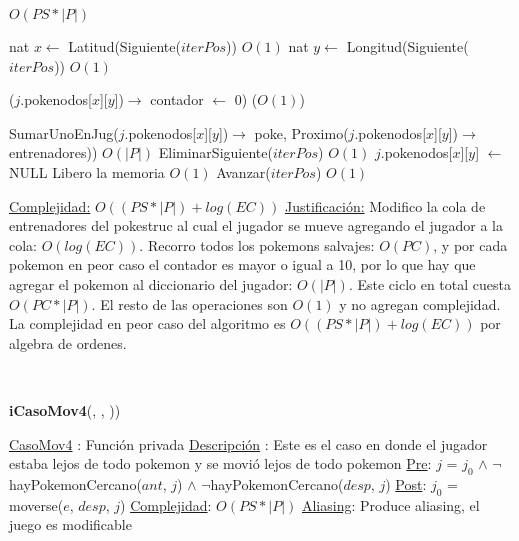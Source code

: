 \begin{Algoritmos}
\begin{algorithmic}[1]
 \Comment $O(PS * |P|)$

  \State nat $x \gets$ Latitud(Siguiente($iterPos$)) \Comment $O(1)$
  \State nat $y \gets$ Longitud(Siguiente($iterPos$)) \Comment $O(1)$   
  
    \State ($j$.pokenodos[$x$][$y$])$\rightarrow$ contador $\gets$ 0) \Comment($O(1)$)
  \EndIf
  
    \State SumarUnoEnJug($j$.pokenodos[$x$][$y$])$\rightarrow$ poke, Proximo($j$.pokenodos[$x$][$y$])$\rightarrow$ entrenadores)) \Comment $O(|P|)$
    \State EliminarSiguiente($iterPos$) \Comment $O(1)$
    \State $j$.pokenodos[$x$][$y$] $\gets$ NULL \Comment Libero la memoria $O(1)$
  \Else 
    \State Avanzar($iterPos$) \Comment $O(1)$ 
  \EndIf

\EndWhile 

\medskip
\Statex \underline{Complejidad:} $O((PS *|P|) + log(EC))$ 
\Statex \underline{Justificaci\'on:} Modifico la cola de entrenadores del pokestruc al cual el jugador se mueve agregando el jugador a la cola: $O(log(EC))$. Recorro todos los pokemons salvajes: $O(PC)$, y por cada pokemon en peor caso el contador es mayor o igual a 10, por lo que hay que agregar el pokemon al diccionario del jugador: $O(|P|)$. Este ciclo en total cuesta $O(PC*|P|)$. El resto de las operaciones son $O(1)$ y no agregan complejidad. La complejidad en peor caso del algoritmo es $O((PS *|P|) + log(EC))$ por algebra de ordenes.
\end{algorithmic}

$ $\newline
$ $\newline


{\textbf{iCasoMov4}(,  , ))}
\begin{algorithmic}[1]

\Statex \underline{CasoMov4} : Funci\'on privada 
\Statex \underline{Descripci\'on} : Este es el caso en donde el jugador estaba lejos de todo pokemon y se movi\'o lejos de todo pokemon
\Statex \underline{Pre}: $j$ = $j_0$ $\land$ $\neg$hayPokemonCercano($ant$, $j$) $\land$ $\neg$hayPokemonCercano($desp$, $j$) 
\Statex \underline{Post}: $j_0$ = moverse($e$, $desp$, $j$) 
\Statex \underline{Complejidad}: $O(PS *|P|)$ 
\Statex \underline{Aliasing}: Produce aliasing, el juego es modificable


\end{algorithmic}
\end{Algoritmos}
